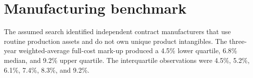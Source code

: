 \section{Manufacturing benchmark}
The assumed search identified independent contract manufacturers that use
routine production assets and do not own unique product intangibles. The
three-year weighted-average full-cost mark-up produced a 4.5\% lower quartile,
6.8\% median, and 9.2\% upper quartile. The interquartile observations were 4.5\%,
5.2\%, 6.1\%, 7.4\%, 8.3\%, and 9.2\%.
